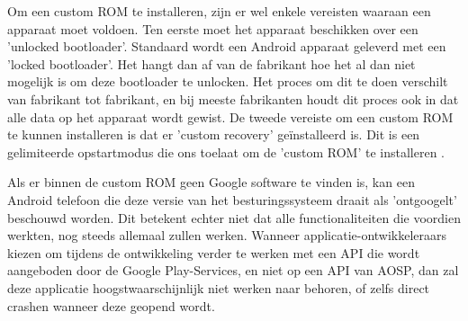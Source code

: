 Om een custom ROM te installeren, zijn er wel enkele vereisten waaraan een apparaat moet voldoen. Ten eerste moet het apparaat beschikken over een 'unlocked bootloader'. Standaard wordt een Android apparaat geleverd met een 'locked bootloader'. Het hangt dan af van de fabrikant hoe het al dan niet mogelijk is om deze bootloader te unlocken. Het proces om dit te doen verschilt van fabrikant tot fabrikant, en bij meeste fabrikanten houdt dit proces ook in dat alle data op het apparaat wordt gewist. De tweede vereiste om een custom ROM te kunnen installeren is dat er 'custom recovery' geïnstalleerd is. Dit is een gelimiteerde opstartmodus die ons toelaat om de 'custom ROM' te installeren \autocite{hoffman_custom-recovery}.

Als er binnen de custom ROM geen Google software te vinden is, kan een Android telefoon die deze versie van het besturingssysteem draait als 'ontgoogelt' beschouwd worden. Dit betekent echter niet dat alle functionaliteiten die voordien werkten, nog steeds allemaal zullen werken. Wanneer applicatie-ontwikkeleraars kiezen om tijdens de ontwikkeling verder te werken met een API die wordt aangeboden door de Google Play-Services, en niet op een API van AOSP, dan zal deze applicatie hoogstwaarschijnlijk niet werken naar behoren, of zelfs direct crashen wanneer deze geopend wordt.


